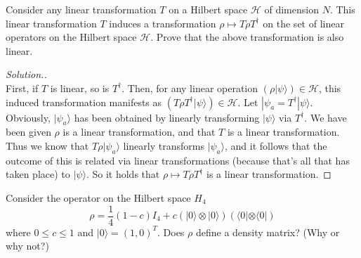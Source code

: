 \documentclass[12pt]{article}
\newenvironment{problem}[2][Problem]{\begin{trivlist}
\item[\hskip \labelsep {\bfseries #1}\hskip \labelsep {\bfseries #2.}]}{\end{trivlist}}
\begin{document}
\begin{problem}{3.5.3}
Consider any linear transformation $T$ on a Hilbert space $\mathcal{H}$ of dimension $N$.
This linear transformation $T$ induces a transformation $\rho\mapsto T\rho T^\dagger$
on the set of linear operators on the Hilbert space $\mathcal{H}$. Prove that the above
transformation is also linear.
\end{problem}

\begin{proof}[Solution.]~\\
First, if $T$ is linear, so is $T^\dagger$. Then, for any linear operation
$(\rho|\psi\rangle)\in\mathcal{H}$, this induced transformation manifests as
$(T\rho T^\dagger|\psi\rangle)\in\mathcal{H}$. Let
$|\psi_a=T^\dagger|\psi\rangle$. Obviously, $|\psi_a\rangle$ has been obtained
by linearly transforming $|\psi\rangle$ via $T^\dagger$. We have been given
$\rho$ is a linear transformation, and that $T$ is a linear transformation.
Thus we know that $T\rho|\psi_a\rangle$ linearly transforms $|\psi_a\rangle$,
and it follows that the outcome of this is related via linear transformations
(because that's all that has taken place) to $|\psi\rangle$. So it holds that
$\rho\mapsto T\rho T^\dagger$ is a linear transformation.
\end{proof}

\begin{problem}{D1}
Consider the operator on the Hilbert space $H_4$
$$\rho=\frac{1}{4}(1-c)I_4+c(|0\rangle\otimes|0\rangle)(\langle0|\otimes\langle0|)$$
where $0\leq c\leq1$ and $|0\rangle=(1,0)^T$. Does $\rho$ define a density matrix?
(Why or why not?)
\end{problem}
\end{document}

